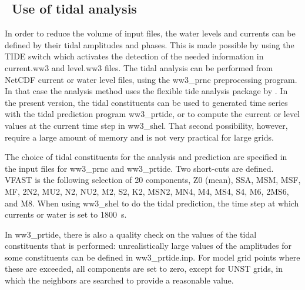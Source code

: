 \vssub
\subsection{~Use of tidal analysis} \label{sub:num_tide}

\noindent
In order to reduce the volume of input files, the water levels and currents
can be defined by their tidal amplitudes and phases. This is made possible by
using the {\code TIDE} switch which activates the detection of the needed
information in current.ww3 and level.ww3 files. The tidal analysis can be
performed from NetCDF current or water level files, using the {\file
  ww3\_prnc} preprocessing program. In that case the analysis method uses the
flexible tide analysis package by \cite{art:For09}.  In the present version,
the tidal constituents can be used to generated time series with the tidal
prediction program {\file ww3\_prtide}, or to compute the current or level
values at the current time step in {\file ww3\_shel}. That second possibility,
however, require a large amount of memory and is not very practical for large
grids.

The choice of tidal constituents for the analysis and prediction are specified
in the input files for {\file ww3\_prnc} and {\file ww3\_prtide}. Two
short-cuts are defined. {\code VFAST} is the following selection of 20
components, Z0 (mean), SSA, MSM, MSF, MF, 2N2, MU2, N2, NU2, M2, S2, K2, MSN2,
MN4, M4, MS4, S4, M6, 2MS6, and M8. When using {\code ww3\_shel} to do the
tidal prediction, the time step at which currents or water is set to 1800~s.

In {\file ww3\_prtide}, there is also a quality check on the values of the
tidal constituents that is performed: unrealistically large values of the
amplitudes for some constituents can be defined in {\file ww3\_prtide.inp}.
For model grid points where these are exceeded, all components are set to
zero, except for UNST grids, in which the neighbors are searched to provide a
reasonable value.
